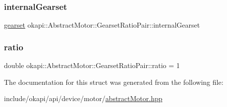 \subsubsection{\texorpdfstring{internalGearset}{internalGearset}}
{\footnotesize\ttfamily \mbox{\hyperlink{classokapi_1_1AbstractMotor_a88aaa6ea2fa10f5520a537bbf26774d5}{gearset}} okapi\+::\+Abstract\+Motor\+::\+Gearset\+Ratio\+Pair\+::internal\+Gearset}

\mbox{\label{structokapi_1_1AbstractMotor_1_1GearsetRatioPair_a4a8e2e226cf3171194616b125ead58cb}} 
\subsubsection{\texorpdfstring{ratio}{ratio}}
{\footnotesize\ttfamily double okapi\+::\+Abstract\+Motor\+::\+Gearset\+Ratio\+Pair\+::ratio = 1}



The documentation for this struct was generated from the following file\+:\begin{DoxyCompactItemize}
\item 
include/okapi/api/device/motor/\mbox{\hyperlink{abstractMotor_8hpp}{abstract\+Motor.\+hpp}}\end{DoxyCompactItemize}
